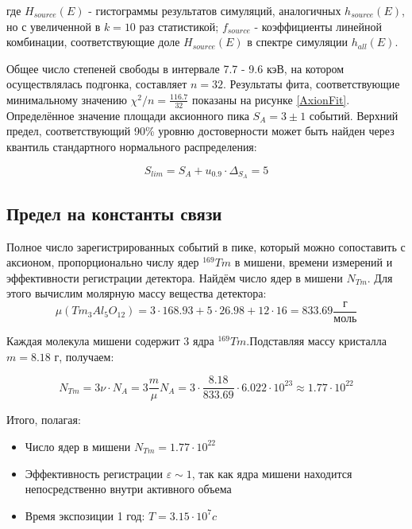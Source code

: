 \documentclass[a4paper,article,14pt]{extarticle}
\begin{document}
где $H_{source}\left( E \right)$ - гистограммы результатов симуляций, аналогичных $h_{source}\left( E \right)$, но с увеличенной в $k=10$ раз статистикой; $f_{source}$ - коэффициенты линейной комбинации, соответствующие доле $H_{source}\left( E \right)$ в спектре симуляции $h_{all} \left( E \right)$.

Общее число степеней свободы в интервале 7.7 - 9.6 кэВ, на котором осуществлялась подгонка, составляет $n = 32$. Результаты фита, соответствующие минимальному значению $\chi^2 /n = \frac{116.7}{32}$ показаны на рисунке \ref{AxionFit}. Определённое значение площади аксионного пика $S_A = 3 \pm 1$ событий. Верхний предел, соответствующий 90\% уровню достоверности может быть найден через квантиль стандартного нормального распределения:

\begin{equation}
    S_{lim} = S_A + u_{0.9} \cdot \Delta_{S_A} = 5
\end{equation}

\subsection{Предел на константы связи}
Полное число зарегистрированных событий в пике, который можно сопоставить с аксионом, пропорционально числу ядер $^{169}Tm$ в мишени, времени измерений и эффективности регистрации детектора. Найдём число ядер в мишени ${N_{Tm}}$. Для этого вычислим молярную массу вещества детектора:
\begin{equation}
    \mu \left( {T{m_3}A{l_5}{O_{12}}} \right) = 3 \cdot 168.93 + 5 \cdot 26.98 + 12 \cdot 16 = 833.69\frac{\text{г}}{{\text{моль}}}
\end{equation}

Каждая молекула мишени содержит 3 ядра $^{169}Tm$.Подставляя массу кристалла $m= 8.18 \text{ г}$, получаем:

\begin{equation}
   {N_{Tm}} = 3\nu  \cdot {N_A} = 3\frac{m}{\mu }{N_A} = 3 \cdot \frac{{8.18}}{{833.69}} \cdot 6.022 \cdot {10^{23}} \approx 1.77 \cdot {10^{22}}
\end{equation}

Итого, полагая:
\begin{itemize}
    \item Число ядер в мишени $N_{Tm} = 1.77 \cdot {10^{22}}$
    \item Эффективность регистрации $\varepsilon \sim 1 $, так как ядра мишени находится непосредственно внутри активного объема
    \item Время экспозиции 1 год: $T = 3.15 \cdot {10^7} c$
\end{itemize}
\end{document}
